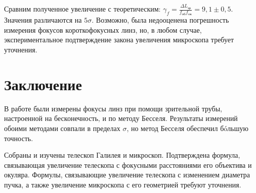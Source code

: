\documentclass[a4paper,12pt]{article} %
\begin{document}
Сравним полученное увеличение с теоретическим: \newline$\boxed{\gamma_f = \frac{\Delta L_\text{зр}}{f_\text{об}f_\text{ок}} = 9,1 \pm 0,5}$. Значения различаются на $5\sigma$. Возможно, была недооценена погрешность измерения фокусов короткофокусных линз, но, в любом случае, экспериментальное подтверждение закона увеличения микроскопа требует уточнения.

\section{Заключение}

В работе были измерены фокусы линз при помощи зрительной трубы, настроенной на бесконечность, и по методу Бесселя. Результаты измерений обоими методами совпали в пределах $\sigma$, но метод Бесселя обеспечил б\'{o}льшую точность.

Собраны и изучены телескоп Галилея и микроскоп. Подтверждена формула, связывающая увеличение телескопа с фокусными расстояниями его объектива и окуляра. Формулы, связывающие увеличение телескопа с изменением диаметра пучка, а также увеличение микроскопа с его геометрией требуют уточнения.
\end{document}
